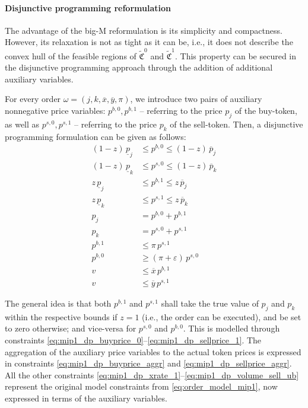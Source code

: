 \documentclass[11pt,parskip=full]{scrartcl}%
\newcommand*{\ie}{i.e., }
\begin{document}
\paragraph{Disjunctive programming reformulation}

The advantage of the big-M reformulation is its simplicity and compactness.
However, its relaxation is not as tight as it can be, \ie it does not describe the convex hull of
the feasible regions of $ \tilde{\mathfrak{C}}^0 $ and $ \tilde{\mathfrak{C}}^1 $.
This property can be secured in the disjunctive programming approach through the addition of
additional auxiliary variables.

For every order $ \omega = (j,k,\overline{x},\overline{y},\pi) $, we introduce two pairs of
auxiliary nonnegative price variables:
$ p^{b,0}, p^{b,1} $ -- referring to the price $ p_j $ of the buy-token, as well as
$ p^{s,0}, p^{s,1} $ -- referring to the price $ p_k $ of the sell-token.
Then, a disjunctive programming formulation can be given as follows:
\begin{subequations}
\begin{align}
  (1-z) \, \underline{p}_j &\le p^{b,0} \le (1-z) \, \overline{p}_j
    \label{eq:mip1_dp_buyprice_0}\\
  (1-z) \, \underline{p}_k &\le p^{s,0} \le (1-z) \, \overline{p}_k
    \label{eq:mip1_dp_sellprice_0}\\[2mm]
  z \, \underline{p}_j &\le p^{b,1} \le z \, \overline{p}_j
    \label{eq:mip1_dp_buyprice_1}\\
  z \, \underline{p}_k &\le p^{s,1} \le z \, \overline{p}_k
    \label{eq:mip1_dp_sellprice_1}\\[2mm]
  p_j &= p^{b,0} + p^{b,1}
    \label{eq:mip1_dp_buyprice_aggr}\\
  p_k &= p^{s,0} + p^{s,1}
    \label{eq:mip1_dp_sellprice_aggr}\\[2mm]
  p^{b,1} &\le \pi \, p^{s,1}
    \label{eq:mip1_dp_xrate_1}\\
  p^{b,0} &\ge (\pi+\varepsilon) \, p^{s,0}
    \label{eq:mip1_dp_xrate_0}\\[2mm]
  v &\le \overline{x} \, p^{b,1}
    \label{eq:mip1_dp_volume_buy_ub}\\
  v &\le \overline{y} \, p^{s,1}
    \label{eq:mip1_dp_volume_sell_ub}
\end{align}
\label{eq:order_model_mip1_DP}
\end{subequations}

The general idea is that both $p^{b,1}$ and $p^{s,1}$ shall take the true value of $p_j$ and
$p_k$ within the respective bounds if $z=1$ (\ie the order can be executed), and be set to
zero otherwise; and vice-versa for $p^{s,0}$ and $p^{b,0}$.
This is modelled through constraints \eqref{eq:mip1_dp_buyprice_0}--\eqref{eq:mip1_dp_sellprice_1}.
The aggregation of the auxiliary price variables to the actual token prices is expressed in
constraints \eqref{eq:mip1_dp_buyprice_aggr} and \eqref{eq:mip1_dp_sellprice_aggr}.
All the other constraints \eqref{eq:mip1_dp_xrate_1}--\eqref{eq:mip1_dp_volume_sell_ub} represent
the original model constraints from \eqref{eq:order_model_mip1}, now expressed in terms of the
auxiliary variables.
\end{document}
